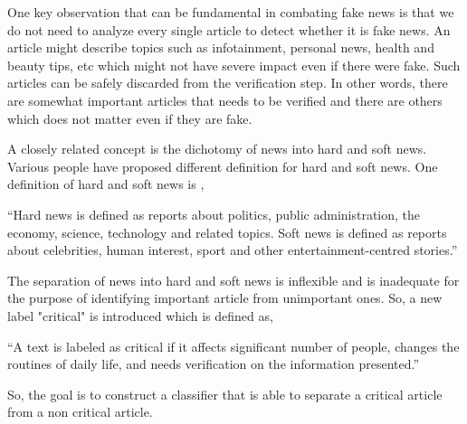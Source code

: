 One key observation that can be fundamental in combating fake news is that we do not need to analyze every single article to detect whether it is fake news. An article might describe topics such as infotainment, personal news, health and beauty tips, etc which might not have severe impact even if there were fake. Such articles can be safely discarded from the verification step. In other words, there are somewhat important articles that needs to be verified and there are others which does not matter even if they are fake.\par
A closely related concept is the dichotomy of news into hard and soft news. Various people have proposed different definition for hard and soft news\cite{reinemann2012hard}\cite{shoemaker2012news}. One definition of hard and soft news is \cite{reinemann2012hard},

\enquote{Hard news is defined as reports about politics, public administration, the economy, science, technology and related topics. Soft news is defined as reports about celebrities, human interest, sport and other entertainment-centred stories.}

The separation of news into hard and soft news is inflexible and is inadequate for the purpose of identifying important article from unimportant ones. So, a new label "critical" is introduced which is defined as, 

\enquote{A text is labeled as critical if it affects significant number of people, changes the routines of daily life, and needs verification on the information presented.}

So, the goal is to construct a classifier that is able to separate a critical article from a non critical article.

